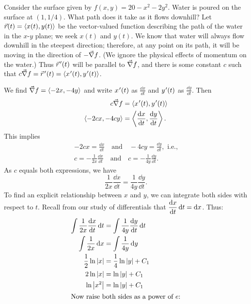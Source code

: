 \begin{example}\label{ex_direct3}%
Consider the surface given by $f(x,y)= 20-x^2-2y^2$. Water is poured on the surface at $(1,1/4)$. What path does it take as it flows downhill?
\solution
Let $\vec r(t) =\left\langle x(t), y(t)\right\rangle$ be the vector-valued function describing the path of the water in the $x$-$y$ plane; we seek $x(t)$ and $y(t)$. We know that water will always flow downhill in the steepest direction; therefore, at any point on its path, it will be moving in the direction of $-\vec\nabla f$. (We ignore the physical effects of momentum on the water.) Thus $\vec r\hskip1.25pt '(t)$ will be parallel to $\vec\nabla f$, and there is some constant $c$ such that $c\grad f = \vrp(t) =\bracket{x\primeskip'(t), y\primeskip'(t)}$. 

We find $\vec\nabla f =\left\langle -2x, -4y\right\rangle$ and write $x\primeskip'(t)$ as $\frac{\dd x}{\dd t}$ and $y\primeskip'(t)$ as $\frac{\dd y}{\dd t}$. Then 
\begin{align*}
c\grad f &=\bracket{x\primeskip'(t), y\primeskip'(t)}\\
\bracket{-2cx, -4cy}& =\bracket{\frac{\dd x}{\dd t}, \frac{\dd y}{\dd t}}.
\end{align*}
This implies
\begin{gather*}
-2cx = \frac{\dd x}{\dd t} \quad \text{and} \quad  -4cy =\frac{\dd y}{\dd t}, \text{ i.e.,}\\
c = -\frac{1}{2x}\frac{\dd x}{\dd t} \quad \text{and} \quad  c =-\frac{1}{4y}\frac{\dd y}{\dd t}.
\end{gather*}
As $c$ equals both expressions, we have
\[\frac{1}{2x}\frac{\dd x}{\dd t} =\frac{1}{4y}\frac{\dd y}{\dd t}.\]
To find an explicit relationship between $x$ and $y$, we can integrate both sides with respect to $t$. Recall from our study of differentials that $\displaystyle \frac{\operatorname{d}\! x}{\operatorname{d}\! t}\operatorname{d}\! t = \operatorname{d}\! x$. Thus:
\begin{align*}
\int \frac{1}{2x}\frac{\dd x}{\dd t}\dd t &=\int \frac{1}{4y}\frac{\dd y}{\dd t}\dd t \\
\int \frac{1}{2x}\dd x &=\int\frac{1}{4y}\dd y \\
\frac 12\ln\abs x &= \frac14\ln\abs y +C_1\\
2\ln\abs x &= \ln\abs y +C_1\\
\ln \abs{x^2} &= \ln\abs y+C_1\\%
\intertext{Now raise both sides as a power of \intertextmath{e}:}

\end{align*}
\end{example}
